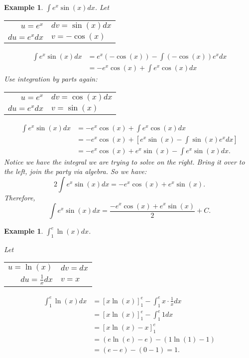 \documentclass[reqno]{amsart}
\newtheorem{eg}[lem]{Example}
\numberwithin{equation}{section}
\begin{document}
\begin{eg} $\int e^x \sin(x)dx$.
Let
\begin{center}
  \begin{tabular}{ r||l}
    $u=e^x$ & $dv=\sin(x) dx$ \\ 
    $du=e^xdx$ & $v=-\cos(x)$\\ 
  \end{tabular}
\end{center}

\begin{align*} \int e^x \sin(x)dx &= e^x(-\cos(x)) - \int (-\cos(x))e^x dx \\
&= -e^x\cos(x) + \int e^x\cos(x) dx
\end{align*}
Use integration by parts again:

\begin{center}
  \begin{tabular}{ r||l}
    $u=e^x$ & $dv=\cos(x) dx$ \\ 
    $du=e^xdx$ & $v=\sin(x)$\\ 
  \end{tabular}
\end{center}

\begin{align*} \int e^x \sin(x)dx &= -e^x\cos(x) + \int e^x\cos(x) dx \\
&= -e^x\cos(x) + \left[ e^x \sin(x) - \int \sin(x) e^x dx \right]\\
&= -e^x\cos(x) + e^x \sin(x) - \int e^x \sin(x)  dx.
\end{align*}
Notice we have the integral we are trying to solve on the right.   Bring it over to the left, join the party via algebra.  So we have:
\[2 \int e^x \sin(x)dx =-e^x\cos(x) + e^x \sin(x). \]
Therefore,
 \[\int e^x \sin(x)dx =\frac{-e^x\cos(x) + e^x \sin(x)}{2} +C. \]
\end{eg}

\begin{eg} $\int_1^e \ln(x) dx$.

Let
\begin{center}
  \begin{tabular}{ r||l}
    $u=\ln(x)$ & $dv=dx$ \\ 
    $du=\frac{1}{x}dx$ & $v=x$\\ 
  \end{tabular}
\end{center}

\begin{align*} \int_1^e \ln(x)dx &= \left[x\ln(x)\right]_1^e - \int_1^e x \cdot \frac{1}{x}dx \\
&= [x\ln(x)]_1^e - \int_1^e 1 dx \\
&= [x\ln(x)-x]_1^e \\
&= (e \ln(e) - e) - (1 \ln(1) -1) \\
&= (e-e)-(0-1) = 1. 
\end{align*}
\end{eg}
\end{document}
